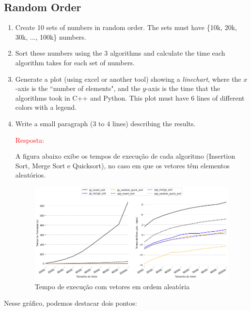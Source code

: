 \documentclass{article}
\begin{document}
\subsection{Random Order}
\begin{enumerate}
  \item Create 10 sets of numbers in random order. The sets must have \{10k, 20k, 30k, ..., 100k\} numbers.
  
  \item Sort these numbers using the 3 algorithms and calculate the time each algorithm takes for each set of numbers.
  
  \item Generate a plot (using excel or another tool) showing a \emph{linechart}, where the $x$-axis is the ``number of elements", and the $y$-axis is the time that the algorithms took in C++ and Python. This plot must have 6 lines of different colors with a legend.
  
  \item Write a small paragraph (3 to 4 lines) describing the results.
  
  \textcolor{red}{Resposta:}
  
  A figura abaixo exibe os tempos de execução de cada algoritmo (Insertion Sort, Merge Sort e Quicksort), no caso em que os vetores têm elementos aleatórios. 
  
  \begin{figure}[!h]
    \centering
    \includegraphics[scale=0.5]{Figures/random.png}
    \caption{Tempo de execução com vetores em ordem aleatória}
    \label{fig:graf-random}
  \end{figure}
\end{enumerate}
    
    Nesse gráfico, podemos destacar dois pontos:
    
\end{document}
